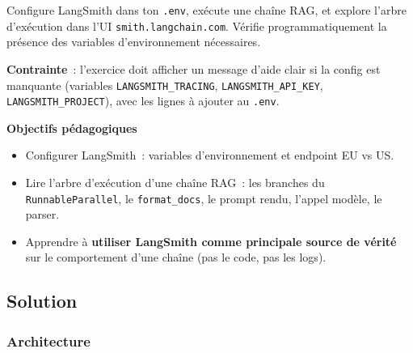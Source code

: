 \documentclass[11pt,a4paper]{article}
\begin{document}
\begin{tcolorbox}[title=Exercice bonus 4. Activer le tracing et lire l'arbre d'exécution]
Configure LangSmith dans ton \texttt{.env}, exécute une chaîne RAG, et
explore l'arbre d'exécution dans l'UI \texttt{smith.langchain.com}.
Vérifie programmatiquement la présence des variables d'environnement
nécessaires.

\textbf{Contrainte}~: l'exercice doit afficher un message d'aide clair
si la config est manquante (variables \texttt{LANGSMITH\_TRACING},
\texttt{LANGSMITH\_API\_KEY}, \texttt{LANGSMITH\_PROJECT}), avec les
lignes à ajouter au \texttt{.env}.

\bigskip
\noindent\textbf{Objectifs pédagogiques}
\begin{itemize}[leftmargin=*]
  \item Configurer LangSmith~: variables d'environnement et endpoint
        EU vs US.
  \item Lire l'arbre d'exécution d'une chaîne RAG~: les branches du
        \texttt{RunnableParallel}, le \texttt{format\_docs}, le prompt
        rendu, l'appel modèle, le parser.
  \item Apprendre à \textbf{utiliser LangSmith comme principale source
        de vérité} sur le comportement d'une chaîne (pas le code, pas
        les logs).
\end{itemize}
\end{tcolorbox}

\subsection{Solution}

\subsubsection{Architecture}

\begin{center}
\end{center}
\end{document}
